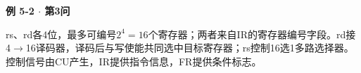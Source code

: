 {\color{ink}\bfseries 例 5-2 \(\cdot \) 第3问}\par\vspace{1bp}rs、rd各4位，最多可编号\(2^{4}=\allowbreak{}16\)个寄存器；两者来自IR的寄存器编号字段。rd接4\(\to \)16译码器，译码后与写使能共同选中目标寄存器；rs控制16选1多路选择器。控制信号由CU产生，IR提供指令信息，FR提供条件标志。
